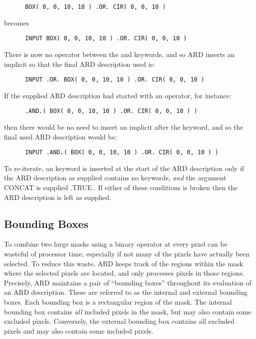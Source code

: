 \small
\begin{verbatim}
      BOX( 0, 0, 10, 10 ) .OR. CIR( 0, 0, 10 )
\end{verbatim}
\normalsize

becomes 

\small
\begin{verbatim}
      INPUT BOX( 0, 0, 10, 10 ) .OR. CIR( 0, 0, 10 )
\end{verbatim}
\normalsize

There is now no operator between the  and  keywords, and so ARD inserts
an implicit  so that the final ARD description used is:

\small
\begin{verbatim}
      INPUT .OR. BOX( 0, 0, 10, 10 ) .OR. CIR( 0, 0, 10 )
\end{verbatim}
\normalsize

If the supplied ARD description had started with an operator, for instance: 

\small
\begin{verbatim}
      .AND.( BOX( 0, 0, 10, 10 ) .OR. CIR( 0, 0, 10 ) )
\end{verbatim}
\normalsize

then there would be no need to insert an implicit  after the  keyword, 
and so the final used ARD description would be:

\small
\begin{verbatim}
      INPUT .AND.( BOX( 0, 0, 10, 10 ) .OR. CIR( 0, 0, 10 ) )
\end{verbatim}
\normalsize

To re-iterate, an  keyword is inserted at the start of the ARD description 
only if the ARD description as supplied contains no  keywords, {\em and}
the  argument CONCAT is supplied .TRUE.. If either of these conditions 
is broken then the ARD description is left as supplied.

\subsection{\label{SEC:BBOX}Bounding Boxes}
To combine two large masks using a binary operator at every pixel can be
wasteful of processor time, especially if not many of the pixels have actually
been selected. To reduce this waste, ARD keeps track of the regions within the
mask where the selected pixels are located, and only processes pixels in those
regions. Precisely, ARD maintains a pair of ``bounding boxes'' throughout its
evaluation of an ARD description. These are referred to as the internal and
external bounding boxes. Each bounding box is a rectangular region of the mask.
The internal bounding box contains {\em all} included pixels in the mask, but
may also contain some excluded pixels. Conversely, the external bounding box
contains all excluded pixels and may also contain some included pixels. 

